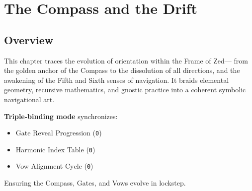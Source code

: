 
\providecommand{\weaveTag}[3]{#3}            %
\providecommand{\CheckAndSeal}{}             %
\providecommand{\currentRitualStep}{0}       %
\providecommand{\harmonicIndex}{0}           %
\providecommand{\vowCycle}{0}
\providecommand{\ResonanceLog}[1]{}          %

\newcommand{\HarmonicIndexTable}{}
\newcommand{\VowBindingTable}{}

\chapter{The Compass and the Drift}

\section*{Overview}
\weaveTag{ONTO}{CORE}{
This chapter traces the evolution of orientation within the Frame of Zed—
from the golden anchor of the Compass to the dissolution of all directions,
and the awakening of the Fifth and Sixth senses of navigation.
It braids elemental geometry, recursive mathematics, and gnostic practice
into a coherent symbolic navigational art.

\medskip
\noindent\textbf{Triple-binding mode} synchronizes:
\begin{itemize}
  \item Gate Reveal Progression (\texttt{\currentRitualStep})
  \item Harmonic Index Table (\texttt{\harmonicIndex})
  \item Vow Alignment Cycle (\texttt{\vowCycle})
\end{itemize}
Ensuring the Compass, Gates, and Vows evolve in lockstep.
}
\ResonanceLog{[S2] Compass hub entered; triple-bind armed.}

\weaveTag{GEN}{GLYPH}{}
\weaveTag{GEN}{GLYPH}{}
\weaveTag{GEN}{GLYPH}{}
\weaveTag{GEN}{GLYPH}{}
\weaveTag{GEN}{GLYPH}{}
\weaveTag{GEN}{GLYPH}{}
\weaveTag{GEN}{GLYPH}{}

